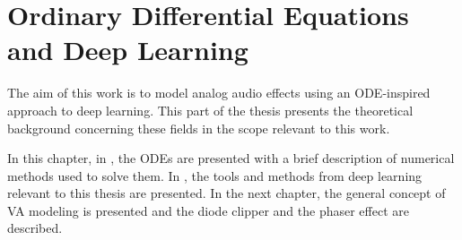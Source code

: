 \chapter{Ordinary Differential Equations and Deep Learning}
\label{chapter:odes_and_dl}

The aim of this work is to model analog audio effects using an \ac{ODE}-inspired approach to deep learning. This part of the thesis presents the theoretical background concerning these fields in the scope relevant to this work. 

In this chapter, in , the \acp{ODE} are presented with a brief description of numerical methods used to solve them. In , the tools and methods from deep learning relevant to this thesis are presented. In the next chapter, the general concept of \ac{VA} modeling is presented and the diode clipper and the phaser effect are described.



